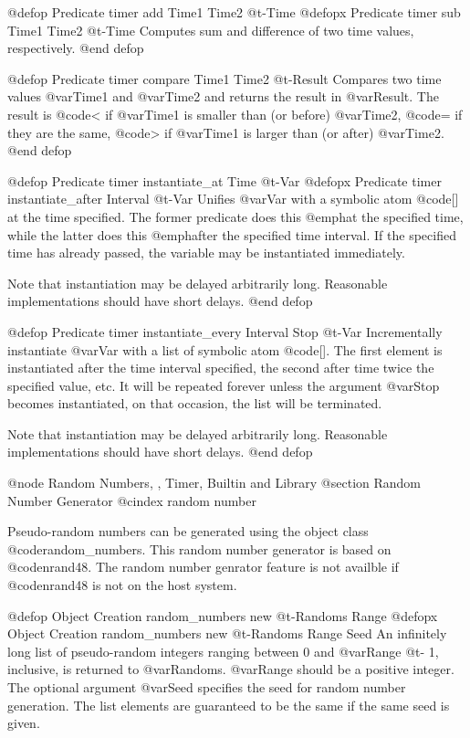 {{{{@defop {Predicate} {timer} add Time1 Time2 @t{-}Time
@defopx {Predicate} {timer} sub Time1 Time2 @t{-}Time
Computes sum and difference of two time values, respectively.
@end defop

@defop {Predicate} {timer} compare Time1 Time2 @t{-}Result
Compares two time values @var{Time1} and @var{Time2} and returns the
result in @var{Result}.  The result is @code{<} if @var{Time1} is
smaller than (or before) @var{Time2}, @code{=} if they are the same,
@code{>} if @var{Time1} is larger than (or after) @var{Time2}.
@end defop

@defop {Predicate} {timer} instantiate_at Time @t{-}Var
@defopx {Predicate} {timer} instantiate_after Interval @t{-}Var
Unifies @var{Var} with a symbolic atom @code{[]} at the time specified.
The former predicate does this @emph{at} the specified time, while the
latter does this @emph{after} the specified time interval.  If the
specified time has already passed, the variable may be instantiated
immediately.

Note that instantiation may be delayed arbitrarily long.  Reasonable
implementations should have short delays.
@end defop

@defop {Predicate} {timer} instantiate_every Interval Stop @t{-}Var
Incrementally instantiate @var{Var} with a list of symbolic atom
@code{[]}.  The first element is instantiated after the time interval
specified, the second after time twice the specified value, etc.
It will be repeated forever unless the argument @var{Stop} becomes
instantiated, on that occasion, the list will be terminated.

Note that instantiation may be delayed arbitrarily long.  Reasonable
implementations should have short delays.
@end defop

@node Random Numbers,  , Timer, Builtin and Library
@section Random Number Generator
@cindex random number

Pseudo-random numbers can be generated using the object class
@code{random_numbers}.  This random number generator is based on
@code{nrand48}.  The random number genrator feature is not availble if
@code{nrand48} is not on the host system.

@defop {Object Creation} random_numbers new @t{-}Randoms Range
@defopx {Object Creation} random_numbers new @t{-}Randoms Range Seed
An infinitely long list of pseudo-random integers ranging between 0 and
@var{Range} @t{-} 1, inclusive, is returned to @var{Randoms}.
@var{Range} should be a positive integer.  The optional argument
@var{Seed} specifies the seed for random number generation.  The list
elements are guaranteed to be the same if the same seed is given.

}}}}
